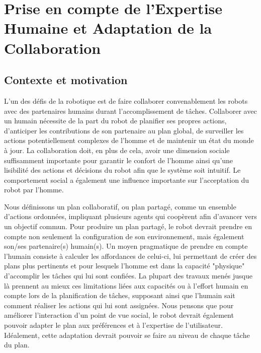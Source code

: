 \documentclass[a4paper,11pt,twoside]{StyleThese}
\begin{document}
\setcounter{chapter}{5} %
\dominitoc
\faketableofcontents
\fi

\chapter{Prise en compte de l'Expertise Humaine et Adaptation de la Collaboration}
\label{chapter5}
\minitoc


\section{Contexte et motivation}
L'un des défis de la robotique est de faire collaborer convenablement les robots avec des partenaires humains durant l'accomplissement de tâches. Collaborer avec un humain nécessite de la part du robot de planifier ses propres actions, d'anticiper les contributions de son partenaire au plan global, de surveiller les actions potentiellement complexes de l'homme et de maintenir un état du monde à jour. La collaboration doit, en plus de cela, avoir une dimension sociale suffisamment importante pour garantir le confort de l'homme ainsi qu'une lisibilité des actions et décisions du robot afin que le système soit intuitif. Le comportement social a également une influence importante sur l'acceptation du robot par l'homme.

Nous définissons un plan collaboratif, ou plan partagé, comme un ensemble d'actions ordonnées, impliquant plusieurs agents qui coopèrent afin d'avancer vers un objectif commun.
Pour produire un plan partagé, le robot devrait prendre en compte non seulement la configuration de son environnement, mais également son/ses partenaire(s) humain(s). Un moyen pragmatique de prendre en compte l'humain consiste à calculer les affordances de celui-ci, lui permettant de créer des plans plus pertinents et pour lesquels l'homme est dans la capacité "physique" d'accomplir les tâches qui lui sont confiées. La plupart des travaux menés jusque là prennent au mieux ces limitations liées aux capacités ou à l'effort humain en compte lors de la planification de tâches, supposant ainsi que l'humain sait comment réaliser les actions qui lui sont assignées.
Nous pensons que pour améliorer l'interaction d'un point de vue social, le robot devrait également pouvoir adapter le plan aux préférences et à l'expertise de l'utilisateur. Idéalement, cette adaptation devrait pouvoir se faire au niveau de chaque tâche du plan.
\end{document}
